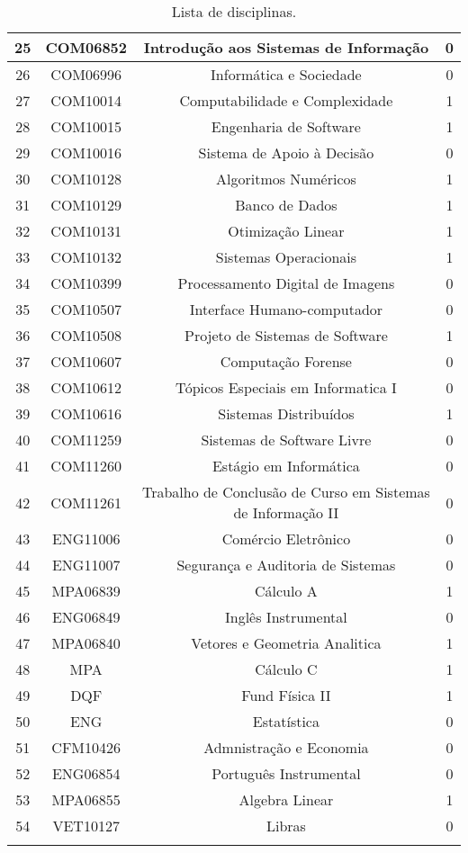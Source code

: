 \begin{apendices}
{\begin{longtable}{|c|c|c|c|}
25 & COM06852 & Introdução aos Sistemas de Informação & 0 \\ \hline
26 & COM06996 & Informática e Sociedade & 0 \\ \hline
27 & COM10014 & Computabilidade e Complexidade & 1 \\ \hline
28 & COM10015 & Engenharia de Software & 1 \\ \hline
29 & COM10016 & Sistema de Apoio à Decisão & 0 \\ \hline
30 & COM10128 & Algoritmos Numéricos & 1 \\ \hline
31 & COM10129 & Banco de Dados & 1 \\ \hline
32 & COM10131 & Otimização Linear & 1 \\ \hline
33 & COM10132 & Sistemas Operacionais & 1 \\ \hline
34 & COM10399 & Processamento Digital de Imagens & 0 \\ \hline
35 & COM10507 & Interface Humano-computador & 0 \\ \hline
36 & COM10508 & Projeto de Sistemas de Software & 1 \\ \hline
37 & COM10607 & Computação Forense & 0 \\ \hline
38 & COM10612 & Tópicos Especiais em Informatica I & 0 \\ \hline
39 & COM10616 & Sistemas Distribuídos & 1 \\ \hline
40 & COM11259 & Sistemas de Software Livre & 0 \\ \hline
41 & COM11260 & Estágio em Informática & 0 \\ \hline
42 & COM11261 & Trabalho de Conclusão de Curso em Sistemas de Informação II & 0 \\ \hline
43 & ENG11006 & Comércio Eletrônico & 0 \\ \hline
44 & ENG11007 & Segurança e Auditoria de Sistemas & 0 \\ \hline
45 & MPA06839 & Cálculo A & 1 \\ \hline
46 & ENG06849 & Inglês Instrumental & 0 \\ \hline
47 & MPA06840 & Vetores e Geometria Analitica & 1 \\ \hline
48 & MPA & Cálculo C & 1 \\ \hline
49 & DQF & Fund Física II & 1 \\ \hline
50 & ENG & Estatística & 0 \\ \hline
51 & CFM10426 & Admnistração e Economia & 0 \\ \hline
52 & ENG06854 & Português Instrumental & 0 \\ \hline
53 & MPA06855 & Algebra Linear & 1 \\ \hline
54 & VET10127 & Libras & 0 \\ \hline
\caption{Lista de disciplinas.\label{ap-lista-discp-2013}}
\end{longtable}
}


\end{apendices}
